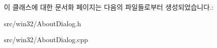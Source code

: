 이 클래스에 대한 문서화 페이지는 다음의 파일들로부터 생성되었습니다.\+:\begin{DoxyCompactItemize}
\item 
src/win32/About\+Dialog.\+h\item 
src/win32/About\+Dialog.\+cpp\end{DoxyCompactItemize}
